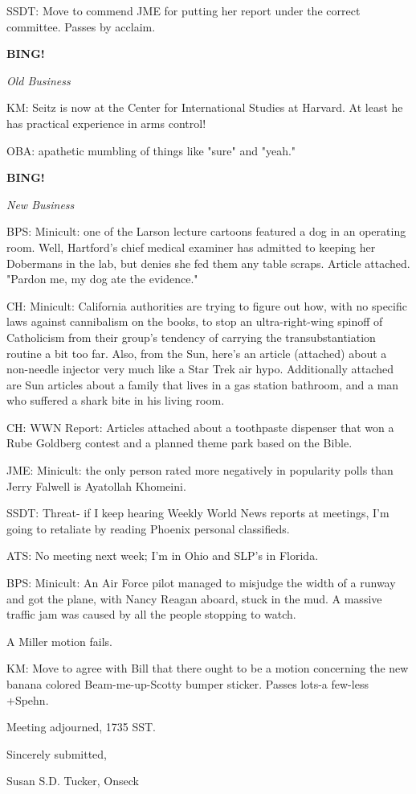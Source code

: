 \documentclass[12pt]{article}
\newcommand{\bing}{{\bf BING!} }
\newcommand{\goto}[1]{\bing \vskip 12pt \centerline{{\em{#1}}}}
\begin{document}
SSDT: Move to commend JME for putting her report under the correct committee. Passes by acclaim.

\goto{Old Business}

KM: Seitz is now at the Center for International Studies at Harvard. At least he has practical experience in arms control!

OBA: apathetic mumbling of things like "sure" and "yeah."

\goto{New Business}

BPS: Minicult: one of the Larson lecture cartoons featured a dog in an operating room. Well, Hartford's chief medical examiner has admitted to keeping her Dobermans in the lab, but denies she fed them any table scraps. Article attached. "Pardon me, my dog ate the evidence."

CH: Minicult: California authorities are trying to figure out how, with no specific laws against cannibalism on the books, to stop an ultra-right-wing spinoff of Catholicism from their group's tendency of carrying the transubstantiation routine a bit too far. Also, from the Sun, here's an article (attached) about a non-needle injector very much like a Star Trek air hypo. Additionally attached are Sun articles about a family that lives in a gas station bathroom, and a man who suffered a shark bite in his living room.

CH: WWN Report: Articles attached about a toothpaste dispenser that won a Rube Goldberg contest and a planned theme park based on the Bible.

JME: Minicult: the only person rated more negatively in popularity polls than Jerry Falwell is Ayatollah Khomeini.

SSDT: Threat- if I keep hearing Weekly World News reports at meetings, I'm going to retaliate by reading Phoenix personal classifieds.

ATS: No meeting next week; I'm in Ohio and SLP's in Florida.

BPS: Minicult: An Air Force pilot managed to misjudge the width of a runway and got the plane, with Nancy Reagan aboard, stuck in the mud. A massive traffic jam was caused by all the people stopping to watch.

A Miller motion fails.

KM: Move to agree with Bill that there ought to be a motion concerning the new banana colored Beam-me-up-Scotty bumper sticker. Passes lots-a few-less +Spehn.

\vspace{12pt}

\noindent
Meeting adjourned, 1735 SST.

\vspace{18pt}

\centerline{Sincerely submitted,}
\centerline{Susan S.D. Tucker, Onseck}
\end{document}
